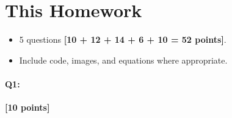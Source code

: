 
\section*{This Homework}
\begin{itemize}
    \item 5 questions \textbf{[10 + 12 + 14 + 6 + 10 = 52 points]}.
    \item Include code, images, and equations where appropriate.
\end{itemize}


\pagebreak
\paragraph{Q1:} \textbf{[10 points]}

